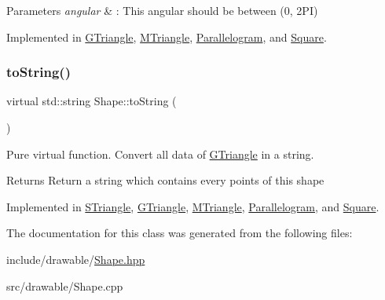 \begin{DoxyParams}{Parameters}
{\em angular} & \+: This angular should be between (0, 2\+PI) \\
\hline
\end{DoxyParams}


Implemented in \hyperlink{classGTriangle_ae3ed75bbad4ba7fed68bc06c5834cfbe}{G\+Triangle}, \hyperlink{classMTriangle_a4be29553eeddf99c367b1ec220bc102b}{M\+Triangle}, \hyperlink{classParallelogram_ac498f6a15dea236ecc49bece023d17b0}{Parallelogram}, and \hyperlink{classSquare_a5714e182c30f996b78e74e1badd054a2}{Square}.

\mbox{\label{classShape_a98fa87c6dc4c7045fd6897a8f3bc186c}} 
\subsubsection{\texorpdfstring{to\+String()}{toString()}}
{\footnotesize\ttfamily virtual std\+::string Shape\+::to\+String (\begin{DoxyParamCaption}{ }\end{DoxyParamCaption})\hspace{0.3cm}{\ttfamily [pure virtual]}}



Pure virtual function. Convert all data of \hyperlink{classGTriangle}{G\+Triangle} in a string. 

\begin{DoxyReturn}{Returns}
Return a string which contains every points of this shape 
\end{DoxyReturn}


Implemented in \hyperlink{classSTriangle_a32e4cee65f52d9ee4121c78dc97d86ab}{S\+Triangle}, \hyperlink{classGTriangle_a8381aeea39fac0d52ad9e0d45b791b3b}{G\+Triangle}, \hyperlink{classMTriangle_a7d1fd825592dffa6ac05b3398a8c105a}{M\+Triangle}, \hyperlink{classParallelogram_a9caae0044f23d8a1e87b1a78d852c37f}{Parallelogram}, and \hyperlink{classSquare_aa5d7db8004bba3c400f57513d93b21d4}{Square}.



The documentation for this class was generated from the following files\+:\begin{DoxyCompactItemize}
\item 
include/drawable/\hyperlink{Shape_8hpp}{Shape.\+hpp}\item 
src/drawable/Shape.\+cpp\end{DoxyCompactItemize}
